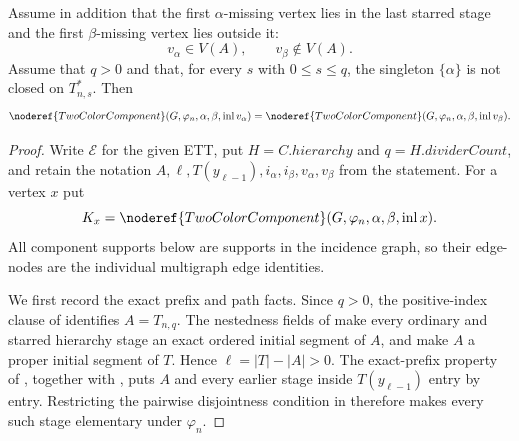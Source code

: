 \begin{lemma}
Assume in addition that the first $\alpha$-missing vertex lies in the
last starred stage and the first $\beta$-missing vertex lies outside it:
\[
        v_\alpha\in V(A),\qquad v_\beta\notin V(A).
\]
Assume that $q>0$ and that, for every $s$ with
$0\leq s\leq q$, the singleton $\{\alpha\}$ is not closed on
$T_{n,s}^{*}$.  Then
\[
 \noderef{TwoColorComponent}(G,\varphi_n,\alpha,\beta,
       \operatorname{inl}v_\alpha)
 =
 \noderef{TwoColorComponent}(G,\varphi_n,\alpha,\beta,
       \operatorname{inl}v_\beta).
\]
\end{lemma}
\begin{proof}
Write $\mathcal E$ for the given ETT, put
$H=C.\mathit{hierarchy}$ and $q=H.\mathit{dividerCount}$, and retain the
notation $A,\ell,T(y_{\ell-1}),i_\alpha,i_\beta,v_\alpha,v_\beta$ from
the statement.  For a vertex $x$ put
\[
 K_x=\noderef{TwoColorComponent}
       (G,\varphi_n,\alpha,\beta,\operatorname{inl}x).
\]
All component supports below are supports in the incidence graph, so their
edge-nodes are the individual multigraph edge identities.

We first record the exact prefix and path facts.  Since $q>0$, the
positive-index clause of  identifies
$A=T_{n,q}$.  The nestedness fields of  make
every ordinary and starred hierarchy stage an exact ordered initial segment
of $A$, and make $A$ a proper initial segment of $T$.  Hence
$\ell=|T|-|A|>0$.  The exact-prefix property of
, together with
, puts $A$ and every earlier stage
inside $T(y_{\ell-1})$ entry by entry.  Restricting the pairwise
disjointness condition in  therefore
makes every such stage elementary under $\varphi_n$.


\end{proof}
